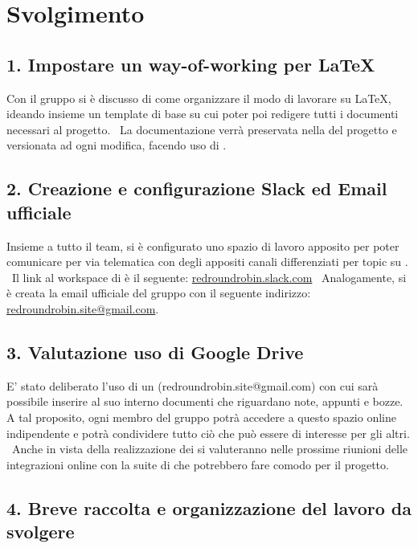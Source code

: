 \newpage
\section*{Svolgimento}

\subsection*{1. Impostare un way-of-working per \LaTeX{} }

Con il gruppo si è discusso di come organizzare il modo di lavorare su \LaTeX{}, ideando insieme un template di base su cui poter poi redigere tutti i documenti necessari al progetto. \
La documentazione verrà preservata nella  del progetto e versionata ad ogni modifica, facendo uso di .

\subsection*{2. Creazione e configurazione Slack ed Email ufficiale}

Insieme a tutto il team, si è configurato uno spazio di lavoro apposito per poter comunicare per via telematica con degli appositi canali differenziati per topic su . \
Il link al workspace di  è il seguente: \href{http://redroundrobin.slack.com}{redroundrobin.slack.com} \
Analogamente, si è creata la email ufficiale del gruppo con il seguente indirizzo:
\href{mailto:redroundrobin.site@gmail.com}{redroundrobin.site@gmail.com}.


\subsection*{3. Valutazione uso di Google Drive}

E' stato deliberato l'uso di un  (redroundrobin.site@gmail.com) con cui sarà possibile inserire al suo interno documenti che riguardano note, appunti e bozze. A tal proposito, ogni membro del gruppo potrà accedere a questo spazio online indipendente e potrà condividere tutto ciò che può essere di interesse per gli altri. \
Anche in vista della realizzazione dei  si valuteranno nelle prossime riunioni delle integrazioni online con la suite di  che potrebbero fare comodo per il progetto.


\subsection*{4. Breve raccolta e organizzazione del lavoro da svolgere}


